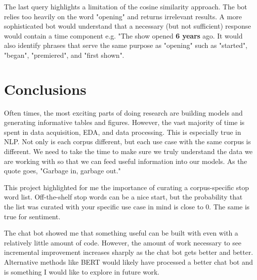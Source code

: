 \documentclass{article}
\begin{document}
The last query highlights a limitation of the cosine similarity approach. The bot relies too heavily on the word "opening" and returns irrelevant results. A more sophisticated bot would understand that a necessary (but not sufficient) response would contain a time component e.g. "The show opened \textbf{6 years} ago. It would also identify phrases that serve the same purpose as "opening" such as "started", "began", "premiered", and "first shown". 

\section{Conclusions}

Often times, the most exciting parts of doing research are building models and generating informative tables and figures. However, the vast majority of time is spent in data acquisition, EDA, and data processing. This is especially true in NLP. Not only is each corpus different, but each use case with the same corpus is different. We need to take the time to make sure we truly understand the data we are working with so that we can feed useful information into our models. As the quote goes, "Garbage in, garbage out."

This project highlighted for me the importance of curating a corpus-specific stop word list. Off-the-shelf stop words can be a nice start, but the probability that the list was curated with your specific use case in mind is close to 0. The same is true for sentiment. 

The chat bot showed me that something useful can be built with even with a relatively little amount of code. However, the amount of work necessary to see incremental improvement increases sharply as the chat bot gets better and better. Alternative methods like BERT would likely have processed a better chat bot and is something I would like to explore in future work. 



\end{document}
